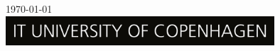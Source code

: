 \begin{titlepage}
{\today}\\[1cm] %


\includegraphics[width=10cm]{img/logo.jpg}\\[1cm] %


\vfill %

\end{titlepage}
